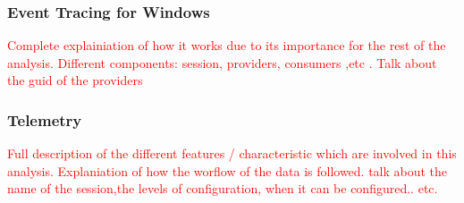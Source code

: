 \subsubsection{Event Tracing for Windows} \label{etw}
\textcolor{red}{Complete explainiation of how it works due to its importance for the rest of the analysis. Different components: session, providers, consumers ,etc .
Talk about the guid of the providers}
\subsubsection{Telemetry}
\textcolor{red}{Full description of the different features / characteristic which are involved in this analysis. Explaniation of how the worflow of the data is followed.
talk about the name of the session,the levels of configuration, when it can be configured.. etc.}

